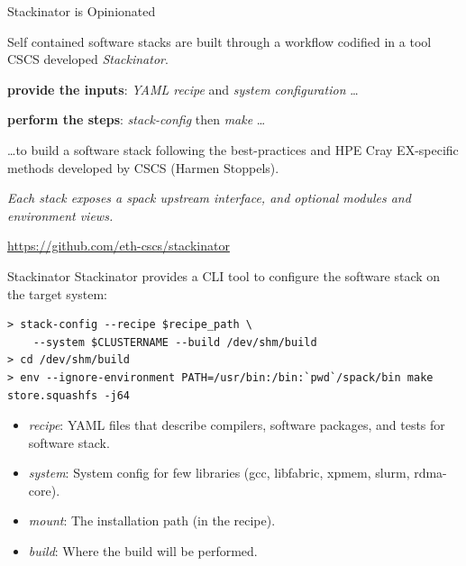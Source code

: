 \documentclass[aspectratio=43]{beamer}
\begin{document}
\begin{frame}[fragile]{Stackinator is Opinionated}
    \begin{center}
        Self contained software stacks are built through a workflow codified in a tool CSCS developed \emph{Stackinator}.

    \vspace{10pt}

        \textbf{provide the inputs}: \emph{YAML recipe} and \emph{system configuration} \dots

    \vspace{10pt}

        \textbf{perform the steps}: \emph{stack-config} then \emph{make} \dots

    \vspace{10pt}

        \dots to build a software stack following the best-practices and HPE Cray EX-specific methods developed by CSCS (Harmen Stoppels).

    \vspace{10pt}

        \emph{Each stack exposes a spack upstream interface, and optional modules and environment views.}

    \end{center}

    \url{https://github.com/eth-cscs/stackinator}
\end{frame}

\begin{frame}[fragile]{Stackinator}
    Stackinator provides a CLI tool to configure the software stack on the target system:

            \begin{lstlisting}[style=talkbash]
> stack-config --recipe $recipe_path \
    --system $CLUSTERNAME --build /dev/shm/build
> cd /dev/shm/build
> env --ignore-environment PATH=/usr/bin:/bin:`pwd`/spack/bin make store.squashfs -j64
            \end{lstlisting}

    \begin{itemize}
        \item \emph{recipe}: YAML files that describe compilers, software packages, and tests for software stack.
        \item \emph{system}: System config for few libraries (gcc, libfabric, xpmem, slurm, rdma-core).
        \item \emph{mount}: The installation path (in the recipe).
        \item \emph{build}: Where the build will be performed.
    \end{itemize}
\end{frame}
\end{document}

